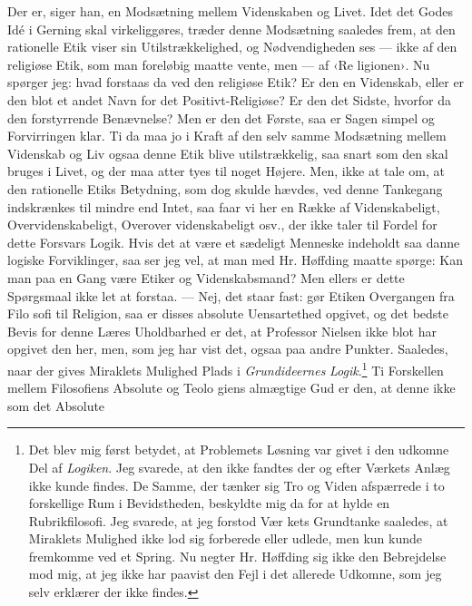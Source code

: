 \documentclass[12pt,a4paper,openany]{book}
\renewcommand{\thefootnote}{*)}
\newcommand{\fnmark}[2]{\renewcommand{\thefootnote}{#1}\footnote{#2}%
  \renewcommand{\thefootnote}{*)}}
\newcommand{\opage}[1]{\marginnote{\footnotesize\textit{[#1]}}}
\begin{document}
Der er, siger han, en Modsætning mellem Videnskaben og
Livet. Idet det Godes Idé i Gerning skal virkeliggøres, træder
denne Modsætning saaledes frem, at den rationelle Etik viser
sin Utilstrækkelighed, og Nødvendigheden ses --- ikke af den
religiøse Etik, som man foreløbig maatte vente, men --- af ‹Re\-%
ligionen›. Nu spørger jeg: hvad forstaas da ved den religiøse
Etik? Er den en Videnskab, eller er den blot et andet Navn
for det Positivt-Religiøse? Er den det Sidste, hvorfor da den
forstyrrende Benævnelse? Men er den det Første, saa er Sagen
simpel og Forvirringen klar. Ti da maa jo i Kraft af den selv\-%
samme Modsætning mellem Videnskab og Liv ogsaa denne Etik
blive utilstrækkelig, saa snart som den skal bruges i Livet, og
der maa atter tyes til noget Højere. Men, ikke at tale om, at
den rationelle Etiks Betydning, som dog skulde hævdes, ved
denne Tankegang indskrænkes til mindre end Intet, saa faar vi
her en Række af Videnskabeligt, Overvidenskabeligt, Overover\-%
videnskabeligt osv., der ikke taler til Fordel for dette Forsvars
Logik. Hvis det at være et sædeligt Menneske indeholdt saa\-%
danne logiske Forviklinger, saa ser jeg vel, at man med Hr.
Høffding maatte spørge: Kan man paa en Gang være Etiker og
Videnskabsmand? Men ellers er dette Spørgsmaal ikke let at
forstaa. --- Nej, det staar fast: gør Etiken Overgangen fra Filo\-%
sofi til Religion, saa er disses absolute Uensartethed opgivet, og
det bedste Bevis for denne Læres Uholdbarhed er det, at
Professor Nielsen ikke blot har opgivet den her, men, som
jeg har vist det, ogsaa paa andre Punkter. Saaledes,
naar der gives Miraklets Mulighed Plads i \emph{Grundideernes}
\opage{20}\emph{Logik}.\fnmark{*)}{Det blev mig først betydet, at Problemets
Løsning var givet i
den udkomne Del af \emph{Logiken}. Jeg svarede, at den ikke fandtes der og
efter Værkets Anlæg ikke kunde findes. De Samme, der tænker sig
Tro og Viden afspærrede i to forskellige Rum i Bevidstheden, beskyldte
mig da for at hylde en Rubrikfilosofi. Jeg svarede, at jeg forstod Vær\-%
kets Grundtanke saaledes, at Miraklets Mulighed ikke lod sig forberede
eller udlede, men kun kunde fremkomme ved et Spring. Nu negter Hr.
Høffding sig ikke den Bebrejdelse mod mig, at jeg ikke har paavist den
Fejl i det allerede Udkomne, som jeg selv erklærer der ikke findes.}
Ti Forskellen mellem Filosofiens Absolute og Teolo\-%
giens almægtige Gud er den, at denne ikke som det Absolute
\end{document}
